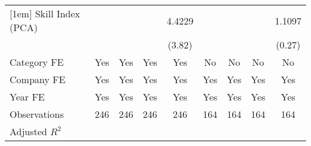 {\begin{tabular}{l*{8}{c}}
[1em]
Skill Index (PCA)                  &                     &                     &                     &      4.4229\sym{***}&                     &                     &                     &      1.1097         \\
                                   &                     &                     &                     &      (3.82)         &                     &                     &                     &      (0.27)         \\
[1em]
Category FE                        &         Yes         &         Yes         &         Yes         &         Yes         &          No         &          No         &          No         &          No         \\
[1em]
Company FE                         &         Yes         &         Yes         &         Yes         &         Yes         &         Yes         &         Yes         &         Yes         &         Yes         \\
[1em]
Year FE                            &         Yes         &         Yes         &         Yes         &         Yes         &         Yes         &         Yes         &         Yes         &         Yes         \\
\hline
Observations                       &         246         &         246         &         246         &         246         &         164         &         164         &         164         &         164         \\
Adjusted \(R^{2}\)                 &                     &                     &                     &                     &                     &                     &                     &                     \\
\hline\hline
\end{tabular}
}
